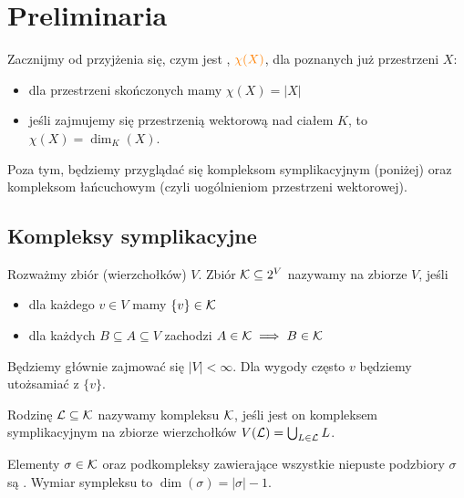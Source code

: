 \section{Preliminaria}

Zacznijmy od przyjżenia się, czym jest , $\color{orange}\chi(X)$, dla poznanych już przestrzeni $X$:

\begin{itemize}
  \item dla przestrzeni skończonych mamy $\chi(X)=|X|$
  \item jeśli zajmujemy się przestrzenią wektorową nad ciałem $K$, to $\chi(X)=\dim_K(X)$.
\end{itemize}

Poza tym, będziemy przyglądać się kompleksom symplikacyjnym (poniżej) oraz kompleksom łańcuchowym (czyli uogólnieniom przestrzeni wektorowej).

\subsection{Kompleksy symplikacyjne}

\begin{definition}
  Rozważmy zbiór (wierzchołków) $V$. Zbiór $\mathcal{K}\subseteq 2^V$ nazywamy  na zbiorze $V$, jeśli

  \begin{itemize}
    \item dla każdego $v\in V$ mamy $\{v\}\in \mathcal{K}$
    \item dla każdych $B\subseteq A\subseteq V$ zachodzi $A\in\mathcal{K}\implies B\in\mathcal{K}$
  \end{itemize}
\end{definition}

Będziemy głównie zajmować się $|V|<\infty$. Dla wygody często $v$ będziemy utożsamiać z $\{v\}$.

Rodzinę $\mathcal{L}\subseteq\mathcal{K}$ nazywamy  kompleksu $\mathcal{K}$, jeśli jest on kompleksem symplikacyjnym na zbiorze wierzchołków $V(\mathcal{L})=\bigcup_{L\in\mathcal{L}}L$.

\begin{definition}[Sympleks]
  Elementy $\sigma\in\mathcal{K}$ oraz podkompleksy zawierające wszystkie niepuste podzbiory $\sigma$ są . Wymiar sympleksu to $\dim(\sigma)=|\sigma|-1$.
\end{definition}
